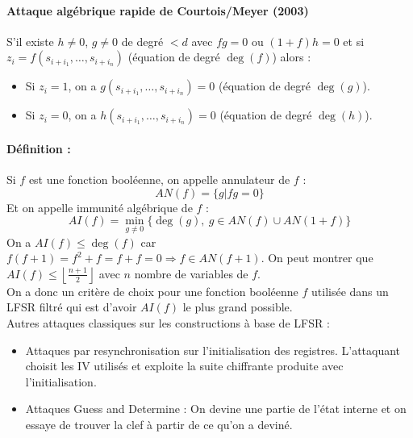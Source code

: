 \documentclass[12pt,a4paper]{report}
\begin{document}
\paragraph{Attaque algébrique rapide de Courtois/Meyer (2003) \\}
S'il existe $h\neq 0$, $g \neq 0$ de degré $<d$ avec $fg=0$ ou $(1+f)h = 0$ et si $z_i = f(s_{i+i_1},\ldots,s_{i+i_n})$ (équation de degré $\deg(f)$) alors :
\begin{itemize}
\item Si $z_i=1$, on a $g(s_{i+i_1},\ldots,s_{i+i_n}) = 0 $ (équation de degré $\deg(g)$).
\item Si $z_i=0$, on a $h(s_{i+i_1},\ldots,s_{i+i_n}) = 0$ (équation de degré $\deg(h)$).
\end{itemize}
\paragraph{Définition :\\}
Si $f$ est une fonction booléenne, on appelle annulateur de $f$ :
$$ AN(f) = \{g|fg=0\}$$
Et on appelle immunité algébrique de $f$ :
$$AI(f) = \min_{g\neq 0} \{\deg(g),\ g \in AN(f) \cup AN(1+f)\}$$
On a $AI(f) \leqslant \deg(f)$ car $f(f+1) = f^2+f = f+f = 0 \Rightarrow f \in AN(f+1)$. On peut montrer que $ AI(f) \leqslant \left\lfloor \frac{n+1}{2} \right\rfloor $ avec $n$ nombre de variables de $f$.\\
On a donc un critère de choix pour une fonction booléenne $f$ utilisée dans un LFSR filtré qui est d'avoir $AI(f)$ le plus grand possible.\\

Autres attaques classiques sur les constructions à base de LFSR :
\begin{itemize}
\item Attaques par resynchronisation sur l'initialisation des registres. L'attaquant choisit les IV utilisés et exploite la suite chiffrante produite avec l'initialisation.
\item Attaques Guess and Determine : On devine une partie de l'état interne et on essaye de trouver la clef à partir de ce qu'on a deviné.
\end{itemize}
\end{document}
